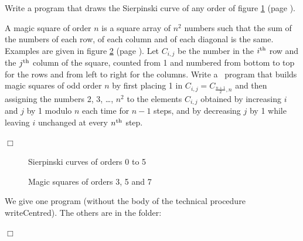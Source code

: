 \begin{exercices}
{\tiret Write a program that draws the Sierpinski curve of any
order of figure \ref{fig:CourbSierp} (page \pageref{fig:CourbSierp}).

\tiret A magic square of order $n$ is a square array of $n^{2}$ numbers
such that the sum of the numbers of each row, of each column and of each
di\-ag\-o\-nal is the same. Examples are given in figure \ref{fig:Cmagic}
(page \pageref{fig:Cmagic}). Let $C_{i, j}$ be the number in the
$i^{\rm th}$ row and the $j^{\rm th}$ column of the square, counted from
1 and numbered from bottom to top for the rows and from left to
right for the columns. Write a \python\ program that builds
magic squares of odd order $n$ by first placing 1 in
$C_{i, j} = C_{\frac{n + 1}{2}, n}$ and then assigning the numbers 2, 3, \ldots, $n^{2}$
to the elements $C_{i, j}$ obtained by increasing $i$ and $j$ by 1 modulo $n$ each time
for $n - 1$ steps, and by decreasing $j$ by 1 while leaving $i$ unchanged at every
$n^{\rm th}$ step.

\noindent $\Box$}\end{exercices}
\begin{figure}[htbp]
 \caption{Sierpinski curves of orders 0 to 5}\label{fig:CourbSierp}
\end{figure}
\begin{figure}[htbp]
 \caption{Magic squares of orders 3, 5 and 7}\label{fig:Cmagic}
\end{figure}

\pagebreak

\begin{corrige}{
We give one program (without the body of the technical procedure {\idt writeCentred}).
The others are in the folder:

\noindent $\Box$}\end{corrige}
\vfill

